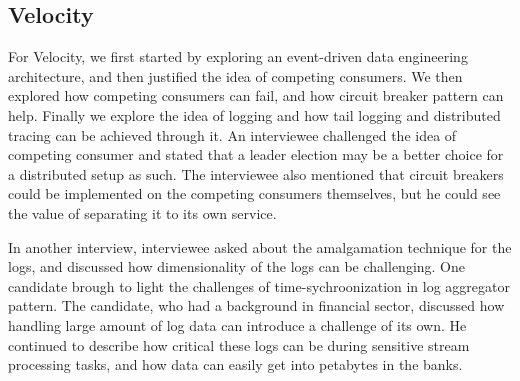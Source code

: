 \documentclass[a4paper,11pt,article,oneside]{memoir}
\begin{document}





\subsection{Velocity}

For Velocity, we first started by exploring an event-driven data engineering architecture, and then justified the idea of competing consumers. We then explored how competing consumers can fail, and how circuit breaker pattern can help. Finally we explore the idea of logging and how tail logging and distributed tracing can be achieved through it. An interviewee challenged the idea of competing consumer and stated that a leader election may be a better choice for a distributed setup as such. The interviewee also mentioned that circuit breakers could be implemented on the competing consumers themselves, but he could see the value of separating it to its own service.  

In another interview, interviewee asked about the amalgamation technique for the logs, and discussed how dimensionality of the logs can be challenging. One candidate brough to light the challenges of time-sychroonization in log aggregator pattern. The candidate, who had a background in financial sector, discussed how handling large amount of log data can introduce a challenge of its own. He continued to describe how critical these logs can be during sensitive stream processing tasks, and how data can easily get into petabytes in the banks. 
\end{document}
